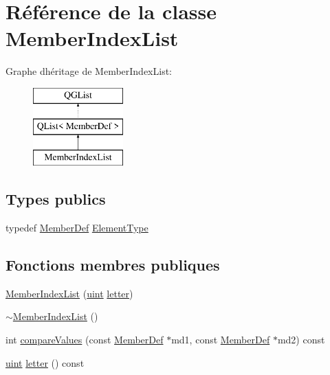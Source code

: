 \hypertarget{class_member_index_list}{}\section{Référence de la classe Member\+Index\+List}
\label{class_member_index_list}
Graphe d\textquotesingle{}héritage de Member\+Index\+List\+:\begin{figure}[H]
\begin{center}
\leavevmode
\includegraphics[height=3.000000cm]{class_member_index_list}
\end{center}
\end{figure}
\subsection*{Types publics}
\begin{DoxyCompactItemize}
\item 
typedef \hyperlink{class_member_def}{Member\+Def} \hyperlink{class_member_index_list_afff05ebbca3ee767d3ddaf9df56bfc20}{Element\+Type}
\end{DoxyCompactItemize}
\subsection*{Fonctions membres publiques}
\begin{DoxyCompactItemize}
\item 
\hyperlink{class_member_index_list_a5c669d61e181f2fb8d7cf29994bfed6c}{Member\+Index\+List} (\hyperlink{qglobal_8h_a4d3943ddea65db7163a58e6c7e8df95a}{uint} \hyperlink{class_member_index_list_ad36af2f2e0edf57a356d38232fd7fe49}{letter})
\item 
\hyperlink{class_member_index_list_a6ac534b0849877bd8ee105b0117493ad}{$\sim$\+Member\+Index\+List} ()
\item 
int \hyperlink{class_member_index_list_ade60aec4004429e2d42112ccac1656f4}{compare\+Values} (const \hyperlink{class_member_def}{Member\+Def} $\ast$md1, const \hyperlink{class_member_def}{Member\+Def} $\ast$md2) const 
\item 
\hyperlink{qglobal_8h_a4d3943ddea65db7163a58e6c7e8df95a}{uint} \hyperlink{class_member_index_list_ad36af2f2e0edf57a356d38232fd7fe49}{letter} () const 
\end{DoxyCompactItemize}


